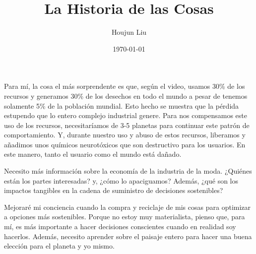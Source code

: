 \documentclass[11pt]{article}
\author{Houjun Liu}
\date{\today}
\title{La Historia de las Cosas}
\begin{document}
\maketitle
\tableofcontents

Para mí, la cosa el más sorprendente es que, según el video, usamos 30\% de los recursos y generamos 30\% de los desechos en todo el mundo a pesar de tenemos solamente 5\% de la población mundial. Esto hecho se muestra que la pérdida estupendo que lo entero complejo industrial genere. Para nos compensamos este uso de los recursos, necesitaríamos de 3-5 planetas para continuar este patrón de comportamiento. Y, durante nuestro uso y abuso de estos recursos, liberamos y añadimos unos químicos neurotóxicos que son destructivo para los usuarios. En este manero, tanto el usuario como el mundo está dañado.

Necesito más información sobre la economía de la industria de la moda. ¿Quiénes están los partes interesadas? y, ¿cómo lo apaciguamos? Además, ¿qué son los impactos tangibles en la cadena de suministro de decisiones sostenibles?

Mejoraré mi conciencia cuando la compra y reciclaje de mis cosas para optimizar a opciones más sostenibles. Porque no estoy muy materialista, pienso que, para mí, es más importante a hacer decisiones conscientes cuando en realidad soy hacerlos. Además, necesito aprender sobre el paisaje entero para hacer una buena elección para el planeta y yo mismo.
\end{document}
